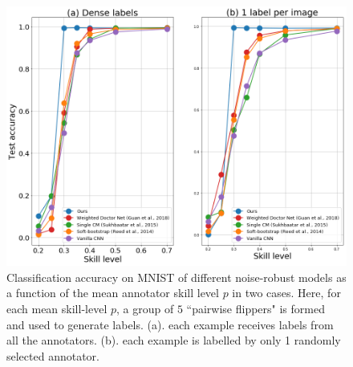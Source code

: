 \begin{figure}[ht]
    \vspace{-1mm}
	\begin{center}
		\includegraphics[width=\linewidth]{chapter_4/figures/figures_new/figure_6.png}
	\end{center}
 	\vspace{-7mm}

	\caption{\small Classification accuracy on MNIST of different noise-robust models as a function of the mean annotator skill level $p$ in two cases. Here, for each mean skill-level $p$, a group of $5$ ``pairwise flippers" is formed and used to generate labels. (a). each example receives labels from all the annotators. (b). each example is labelled by only 1 randomly selected annotator. }
	\label{fig:accuracy_vs_noise_levels}
	\vspace{-4mm}

\end{figure}



	
